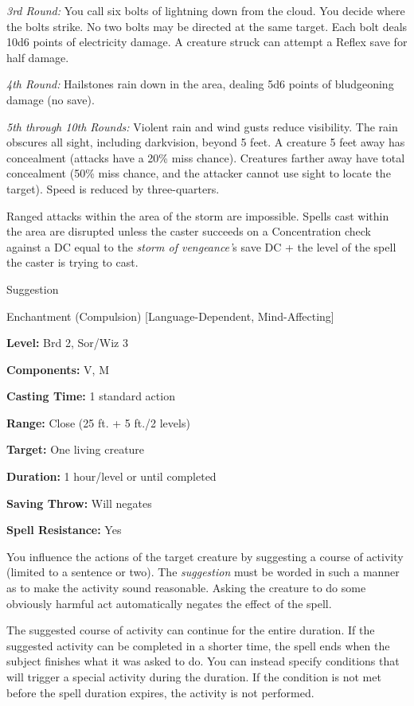 \documentclass{article}
\begin{document}
\textit{3rd Round: }You call six bolts of lightning down from the cloud. You decide 
where the bolts strike. No two bolts may be directed at the same target. Each bolt 
deals 10d6 points of electricity damage. A creature struck can attempt a Reflex 
save for half damage.

\textit{4th Round: }Hailstones rain down in the area, dealing 5d6 points of bludgeoning 
damage (no save).

\textit{5th through 10th Rounds: }Violent rain and wind gusts reduce visibility. 
The rain obscures all sight, including darkvision, beyond 5 feet. A creature 5 
feet away has concealment (attacks have a 20\% miss chance). Creatures farther 
away have total concealment (50\% miss chance, and the attacker cannot use sight 
to locate the target). Speed is reduced by three-quarters.

Ranged attacks within the area of the storm are impossible. Spells cast within 
the area are disrupted unless the caster succeeds on a Concentration check against 
a DC equal to the \textit{storm of vengeance'}s save DC + the level of the spell 
the caster is trying to cast.

\vspace{12pt}
Suggestion

Enchantment (Compulsion) [Language-Dependent, Mind-Affecting]

\textbf{Level:} Brd 2, Sor/Wiz 3

\textbf{Components:} V, M

\textbf{Casting Time:} 1 standard action

\textbf{Range:} Close (25 ft. + 5 ft./2 levels)

\textbf{Target:} One living creature

\textbf{Duration:} 1 hour/level or until completed

\textbf{Saving Throw: }Will negates

\textbf{Spell Resistance:} Yes

You influence the actions of the target creature by suggesting a course of activity 
(limited to a sentence or two). The \textit{suggestion }must be worded in such 
a manner as to make the activity sound reasonable. Asking the creature to do some 
obviously harmful act automatically negates the effect of the spell. 

The suggested course of activity can continue for the entire duration. If the suggested 
activity can be completed in a shorter time, the spell ends when the subject finishes 
what it was asked to do. You can instead specify conditions that will trigger a 
special activity during the duration. If the condition is not met before the spell 
duration expires, the activity is not performed.
\end{document}
